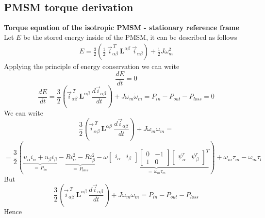 \documentclass[12pt,a4paper]{scrartcl}
\begin{document}
\begin{onehalfspace}
\subsection{PMSM torque derivation}
\textbf{Torque equation of the isotropic PMSM - stationary reference frame}\\
Let $E$ be the stored energy inside of the PMSM, it can be described as follows
\begin{equation*}
	\begin{aligned}
		E = \frac{3}{2} \left(\frac{1}{2}\ \vec{i}_{\alpha\beta}^{\ T}\ \mathbf{L}^{\alpha\beta}\ \vec{i}_{\alpha\beta}\right) +\frac{1}{2}J\omega_m^2
	\end{aligned} 
\end{equation*}
Applying the principle of energy conservation we can write
\begin{equation*}
	\frac{dE}{dt} = 0
\end{equation*}
\begin{equation*}
	\frac{dE}{dt} = \frac{3}{2} \left( \vec{i}_{\alpha\beta}^{\ T}\ \mathbf{L}^{\alpha\beta}\ \frac{d\vec{i}_{\alpha\beta}}{dt}\right) + J\omega_m\dot{\omega}_m= P_{in}-P_{out}-P_{loss} = 0
\end{equation*}
We can write
\begin{equation*}
	\frac{3}{2} \left( \vec{i}_{\alpha\beta}^{\ T}\ \mathbf{L}^{\alpha\beta}\ \frac{d\vec{i}_{\alpha\beta}}{dt}\right) + J\omega_m\dot{\omega}_m =
\end{equation*}
\begin{equation*}
	=\frac{3}{2}\left( \underbrace{u_\alpha i_\alpha+u_\beta i_\beta}_{=\,P_{in}}-\underbrace{Ri_\alpha^2-Ri_\beta^2}_{=\,P_{loss}}-\underbrace{\omega 
		\begin{bmatrix} i_\alpha & i_\beta \end{bmatrix}
		\begin{bmatrix} 0 & -1 \\ 1 & 0\end{bmatrix}
		\begin{bmatrix} \psi^r_\alpha & \psi^r_\beta \end{bmatrix}^T
	}_{=\,\omega_m\tau_m}\right)  +\omega_m\tau_m-\omega_m\tau_l
\end{equation*}
But 
\begin{equation*}
	\frac{3}{2} \left( \vec{i}_{\alpha\beta}^{\ T}\ \mathbf{L}^{\alpha\beta}\ \frac{d\vec{i}_{\alpha\beta}}{dt}\right) + J\omega_m\dot{\omega}_m= P_{in}-P_{out}-P_{loss}
\end{equation*}
Hence
\begin{equation*}

\end{equation*}
\end{onehalfspace}
\end{document}
